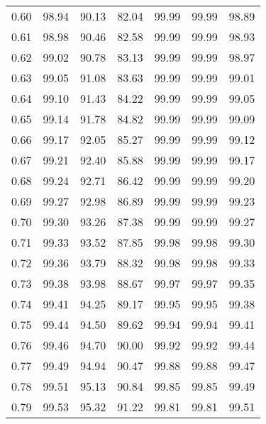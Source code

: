 \begin{tabular}{|c|c|c|c|c|c|c|}
      0.60 &     98.94 &     90.13 &      82.04 &   99.99 &      99.99 &         98.89 \\
      0.61 &     98.98 &     90.46 &      82.58 &   99.99 &      99.99 &         98.93 \\
      0.62 &     99.02 &     90.78 &      83.13 &   99.99 &      99.99 &         98.97 \\
      0.63 &     99.05 &     91.08 &      83.63 &   99.99 &      99.99 &         99.01 \\
      0.64 &     99.10 &     91.43 &      84.22 &   99.99 &      99.99 &         99.05 \\
      0.65 &     99.14 &     91.78 &      84.82 &   99.99 &      99.99 &         99.09 \\
      0.66 &     99.17 &     92.05 &      85.27 &   99.99 &      99.99 &         99.12 \\
      0.67 &     99.21 &     92.40 &      85.88 &   99.99 &      99.99 &         99.17 \\
      0.68 &     99.24 &     92.71 &      86.42 &   99.99 &      99.99 &         99.20 \\
      0.69 &     99.27 &     92.98 &      86.89 &   99.99 &      99.99 &         99.23 \\
      0.70 &     99.30 &     93.26 &      87.38 &   99.99 &      99.99 &         99.27 \\
      0.71 &     99.33 &     93.52 &      87.85 &   99.98 &      99.98 &         99.30 \\
      0.72 &     99.36 &     93.79 &      88.32 &   99.98 &      99.98 &         99.33 \\
      0.73 &     99.38 &     93.98 &      88.67 &   99.97 &      99.97 &         99.35 \\
      0.74 &     99.41 &     94.25 &      89.17 &   99.95 &      99.95 &         99.38 \\
      0.75 &     99.44 &     94.50 &      89.62 &   99.94 &      99.94 &         99.41 \\
      0.76 &     99.46 &     94.70 &      90.00 &   99.92 &      99.92 &         99.44 \\
      0.77 &     99.49 &     94.94 &      90.47 &   99.88 &      99.88 &         99.47 \\
      0.78 &     99.51 &     95.13 &      90.84 &   99.85 &      99.85 &         99.49 \\
      0.79 &     99.53 &     95.32 &      91.22 &   99.81 &      99.81 &         99.51 \\

\end{tabular}
